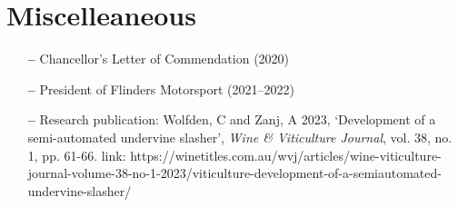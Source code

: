 \section{Miscelleaneous}
\begin{itemize}[leftmargin=10pt, noitemsep]
	\item[\textbf{--}] Chancellor's Letter of Commendation
		(2020)
	\item[\textbf{--}] President of Flinders Motorsport
		(2021--2022)
	\item[\textbf{--}] Research publication:
		Wolfden, C and Zanj, A 2023, `Development of a semi-automated undervine slasher', \textit{Wine \& Viticulture Journal}, vol. 38, no. 1, pp. 61-66. link: https://winetitles.com.au/wvj/articles/wine-viticulture-journal-volume-38-no-1-2023/viticulture-development-of-a-semiautomated-undervine-slasher/
\end{itemize}
